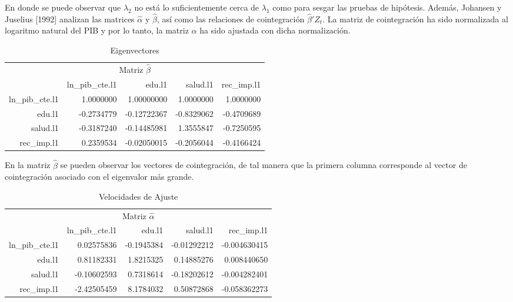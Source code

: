En donde se puede observar que $\lambda_2$ no está lo suficientemente cerca de $\lambda_1$ como para sesgar las pruebas de hipótesis. Además, Johansen y Juselius [1992] analizan las matrices $\hat{\alpha}$ y $\hat{\beta}$, así como las relaciones de cointegración $\hat{\beta}'Z_t$. La matriz de cointegración ha sido normalizada al logaritmo natural del PIB y por lo tanto, la matriz $\hat{\alpha}$ ha sido ajustada con dicha normalización.
   
\begin{table}[H]
\begin{center}
    \begin{tabular}{rrrrr}
    \hline
    \multicolumn{5}{c}{Matriz $\hat{\beta}$ } \\
        \cline{1-5}
        			  		& ln\_pib\_cte.l1	 		& edu.l1		  		& salud.l1			&	rec\_imp.l1 \\
        \hline
        ln\_pib\_cte.l1		& 1.0000000			& 1.00000000			& 1.0000000		& 	1.0000000	   \\
        edu.l1			& -0.2734779			&  -0.12722367			& -0.8329062		& 	  -0.4709689  \\
        salud.l1			& -0.3187240			&  -0.14485981			& 1.3555847		& 	 -0.7250595  \\
        rec\_imp.l1			& 0.2359534			& -0.02050015			& -0.2056044		& 	  -0.4166424  \\
        \hline
    \end{tabular}
\end{center}
\caption {Eigenvectores} \label{tab:eigenvectors} 
\end{table}

En la matriz $\hat{\beta}$ se pueden observar los vectores de cointegración, de tal manera que la primera columna corresponde al vector de cointegración asociado con el eigenvalor más grande. 


  \begin{table}[H]
\begin{center}
    \begin{tabular}{rrrrr}
    \hline
    \multicolumn{5}{c}{Matriz $\hat{\alpha}$ } \\
        \cline{1-5}
        			  		& ln\_pib\_cte.l1	 		& edu.l1		  		& salud.l1			&	rec\_imp.l1 \\
        \hline
        ln\_pib\_cte.l1		& 0.02575836				& -0.1945384			& -0.01292212		& -0.004630415	   \\
        edu.l1			&0.81182331				&  1.8215325 			& 0.14885276		&  0.008440650  \\
        salud.l1			& -0.10602593 				& 0.7318614 			&-0.18202612		& -0.004282401  \\
        rec\_imp.l1		&-2.42505459				&  8.1784032			&  0.50872868 		&-0.058362273  \\
        \hline
    \end{tabular}
\end{center}
\caption {Velocidades de Ajuste} \label{tab:weights} 
\end{table}
     
